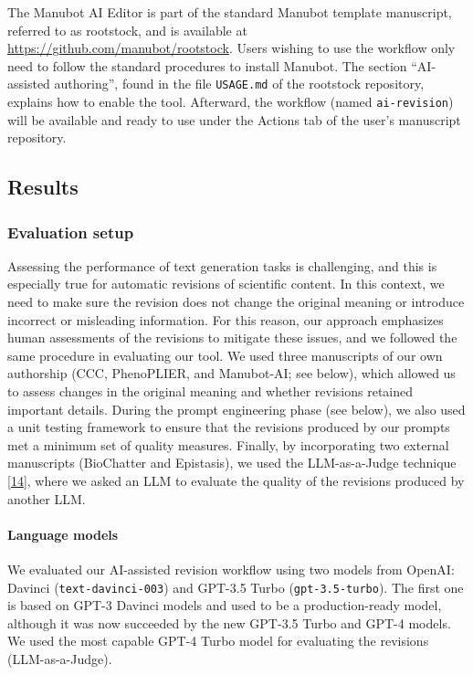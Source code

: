 \documentclass[
]{article}
\begin{document}
The Manubot AI Editor is part of the standard Manubot template manuscript, referred to as rootstock, and is available at \url{https://github.com/manubot/rootstock}.
Users wishing to use the workflow only need to follow the standard procedures to install Manubot.
The section ``AI-assisted authoring'', found in the file \texttt{USAGE.md} of the rootstock repository, explains how to enable the tool.
Afterward, the workflow (named \texttt{ai-revision}) will be available and ready to use under the Actions tab of the user's manuscript repository.

\subsection{Results}

\subsubsection{Evaluation setup}

Assessing the performance of text generation tasks is challenging, and this is especially true for automatic revisions of scientific content.
In this context, we need to make sure the revision does not change the original meaning or introduce incorrect or misleading information.
For this reason, our approach emphasizes human assessments of the revisions to mitigate these issues, and we followed the same procedure in evaluating our tool.
We used three manuscripts of our own authorship (CCC, PhenoPLIER, and Manubot-AI; see below), which allowed us to assess changes in the original meaning and whether revisions retained important details.
During the prompt engineering phase (see below), we also used a unit testing framework to ensure that the revisions produced by our prompts met a minimum set of quality measures.
Finally, by incorporating two external manuscripts (BioChatter and Epistasis), we used the LLM-as-a-Judge technique {[}\protect\hyperlink{ref-LhEwBH2w}{14}{]}, where we asked an LLM to evaluate the quality of the revisions produced by another LLM.

\paragraph{Language models}

We evaluated our AI-assisted revision workflow using two models from OpenAI: Davinci (\texttt{text-davinci-003}) and GPT-3.5 Turbo (\texttt{gpt-3.5-turbo}).
The first one is based on GPT-3 Davinci models and used to be a production-ready model, although it was now succeeded by the new GPT-3.5 Turbo and GPT-4 models.
We used the most capable GPT-4 Turbo model for evaluating the revisions (LLM-as-a-Judge).
\end{document}
